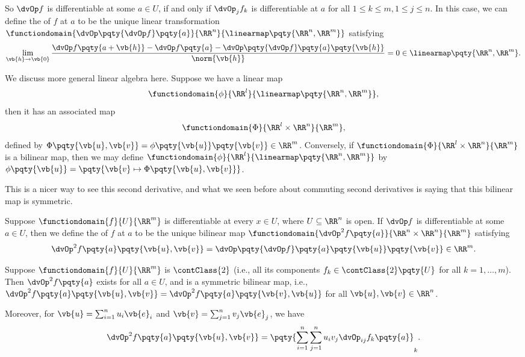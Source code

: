 So \(\dvOp f\) is differentiable at some \(a \in U\), if and only if \(\dvOp_j f_k\) is differentiable at \(a\) for all \(1 \leq k \leq m, 1 \leq j \leq n\). In this case, we can define the  of \(f\) at \(a\) to be the unique linear transformation \(\functiondomain{\dvOp\pqty{\dvOp f}\pqty{a}}{\RR^n}{\linearmap\pqty{\RR^n, \RR^m}}\) satisfying
\[
    \lim_{\vb{h} \to \vb{0}} \frac{\dvOp f\pqty{a + \vb{h}} - \dvOp f\pqty{a} - \dvOp\pqty{\dvOp f} \pqty{a}\pqty{\vb{h}}}{\norm{\vb{h}}} = 0 \in \linearmap\pqty{\RR^n, \RR^m}.
\]

We discuss more general linear algebra here. Suppose we have a linear map
\[
    \functiondomain{\phi}{\RR^l}{\linearmap\pqty{\RR^n, \RR^m}},
\]
then it has an associated map
\[
    \functiondomain{\Phi}{\RR^l \times \RR^n}{\RR^m},
\]
defined by \(\Phi\pqty{\vb{u}, \vb{v}} = \phi\pqty{\vb{u}}\pqty{\vb{v}} \in \RR^m\). Conversely, if \(\functiondomain{\Phi}{\RR^l \times \RR^n}{\RR^m}\) is a bilinear map, then we may define \(\functiondomain{\phi}{\RR^l}{\linearmap\pqty{\RR^n, \RR^m}}\) by \(\phi\pqty{\vb{u}} = \pqty{\vb{v} \mapsto \Phi\pqty{\vb{u}, \vb{v}}}\).

This is a nicer way to see this second derivative, and what we seen before about commuting second derivatives is saying that this bilinear map is symmetric.

\begin{definition}
    Suppose \(\functiondomain{f}{U}{\RR^m}\) is differentiable at every \(x \in U\), where \(U \subseteq \RR^n\) is open. If \(\dvOp f\) is differentiable at some \(a \in U\), then we define the  of \(f\) at \(a\) to be the unique bilinear map \(\functiondomain{\dvOp^2 f\pqty{a}}{\RR^n \times \RR^n}{\RR^m}\) satisfying
    \[
        \dvOp^2 f\pqty{a}\pqty{\vb{u}, \vb{v}} = \dvOp\pqty{\dvOp f}\pqty{a}\pqty{\vb{u}}\pqty{\vb{v}} \in \RR^m.
    \]
\end{definition}

\begin{theorem}
    Suppose \(\functiondomain{f}{U}{\RR^m}\) is \(\contClass{2}\) (i.e., all its components \(f_k \in \contClass{2} \pqty{U}\) for all \(k = 1, \ldots, m\)). Then \(\dvOp^2 f\pqty{a}\) exists for all \(a \in U\), and is a symmetric bilinear map, i.e., \(\dvOp^2 f\pqty{a}\pqty{\vb{u}, \vb{v}} = \dvOp^2 f\pqty{a}\pqty{\vb{v}, \vb{u}}\) for all \(\vb{u}, \vb{v} \in \RR^n\).

    Moreover, for \(\vb{u} = \sum_{i = 1}^{n} u_i \vb{e}_i\) and \(\vb{v} = \sum_{j = 1}^{n} v_j \vb{e}_j\), we have
    \[
        \dvOp^2 f\pqty{a}\pqty{\vb{u}, \vb{v}} = \pqty{\sum_{i = 1}^{n} \sum_{j = 1}^{n} u_i v_j \dvOp_{ij} f_k\pqty{a}}_k.
    \]
\end{theorem}

